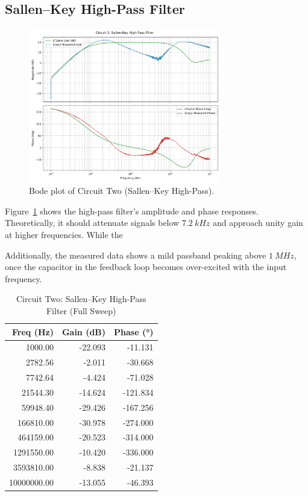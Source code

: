 \documentclass[12pt]{article}
\begin{document}
\subsection{Sallen--Key High-Pass Filter}

\begin{figure}[H]
	\centering
	\includegraphics[width=0.75\textwidth]{07_bode2}
	\caption{Bode plot of Circuit Two (Sallen--Key High-Pass).}
	\label{fig:bode2}
\end{figure}

Figure~\ref{fig:bode2} shows the high-pass filter’s amplitude and phase
responses. Theoretically, it should attenuate signals below
$\SI{7.2}{kHz}$ and approach unity gain at higher frequencies. While the

Additionally, the measured data shows a mild passband peaking above
$\SI{1}{MHz}$, once the capacitor in the feedback loop becomes over-excited
with the input frequency.

\begin{table}[H]
\centering
\begin{tabular}{|r|r|r|}
\hline
\textbf{Freq (Hz)} & \textbf{Gain (dB)} & \textbf{Phase (°)} \\
\hline
1000.00    & -22.093 &  -11.131 \\
2782.56    &  -2.011 &  -30.668 \\
7742.64    &  -4.424 &  -71.028 \\
21544.30   & -14.624 & -121.834 \\
59948.40   & -29.426 & -167.256 \\
166810.00  & -30.978 & -274.000 \\
464159.00  & -20.523 & -314.000 \\
1291550.00 & -10.420 & -336.000 \\
3593810.00 &  -8.838 &  -21.137 \\
10000000.00 & -13.055 &  -46.393 \\
\hline
\end{tabular}
\caption{Circuit Two: Sallen--Key High-Pass Filter (Full Sweep)}
\label{tab:C2_HPF_full}
\end{table}
\end{document}
